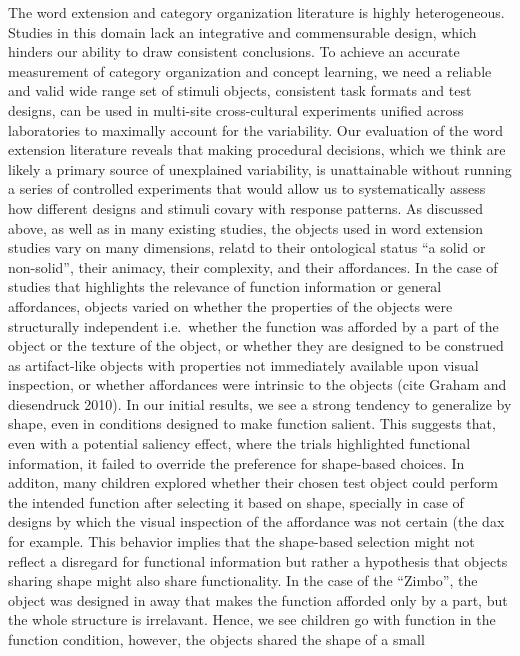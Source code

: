 \documentclass[10pt, letterpaper]{article}
\begin{document}
The word extension and category organization literature is highly
heterogeneous. Studies in this domain lack an integrative and
commensurable design, which hinders our ability to draw consistent
conclusions. To achieve an accurate measurement of category organization
and concept learning, we need a reliable and valid wide range set of
stimuli objects, consistent task formats and test designs, can be used
in multi-site cross-cultural experiments unified across laboratories to
maximally account for the variability. Our evaluation of the word
extension literature reveals that making procedural decisions, which we
think are likely a primary source of unexplained variability, is
unattainable without running a series of controlled experiments that
would allow us to systematically assess how different designs and
stimuli covary with response patterns. As discussed above, as well as in
many existing studies, the objects used in word extension studies vary
on many dimensions, relatd to their ontological status ``a solid or
non-solid'', their animacy, their complexity, and their affordances. In
the case of studies that highlights the relevance of function
information or general affordances, objects varied on whether the
properties of the objects were structurally independent i.e.~whether the
function was afforded by a part of the object or the texture of the
object, or whether they are designed to be construed as artifact-like
objects with properties not immediately available upon visual
inspection, or whether affordances were intrinsic to the objects (cite
Graham and diesendruck 2010). In our initial results, we see a strong
tendency to generalize by shape, even in conditions designed to make
function salient. This suggests that, even with a potential saliency
effect, where the trials highlighted functional information, it failed
to override the preference for shape-based choices. In additon, many
children explored whether their chosen test object could perform the
intended function after selecting it based on shape, specially in case
of designs by which the visual inspection of the affordance was not
certain (the dax for example. This behavior implies that the shape-based
selection might not reflect a disregard for functional information but
rather a hypothesis that objects sharing shape might also share
functionality. In the case of the ``Zimbo'', the object was designed in
away that makes the function afforded only by a part, but the whole
structure is irrelavant. Hence, we see children go with function in the
function condition, however, the objects shared the shape of a small
\end{document}
